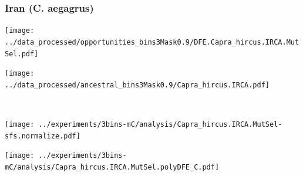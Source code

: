 \subsubsection{Iran (C. aegagrus)}

\begin{minipage}{0.49\linewidth}
    \texttt{[image: ../data\_processed/opportunities\_bins3Mask0.9/DFE.Capra\_hircus.IRCA.MutSel.pdf]}
\end{minipage}
\begin{minipage}{0.49\linewidth}
    \texttt{[image: ../data\_processed/ancestral\_bins3Mask0.9/Capra\_hircus.IRCA.pdf]}
\end{minipage}
\\
\begin{minipage}{0.49\linewidth}
    \texttt{[image: ../experiments/3bins-mC/analysis/Capra\_hircus.IRCA.MutSel-sfs.normalize.pdf]}
\end{minipage}
\begin{minipage}{0.4\linewidth}
    \texttt{[image: ../experiments/3bins-mC/analysis/Capra\_hircus.IRCA.MutSel.polyDFE\_C.pdf]}
\end{minipage}
